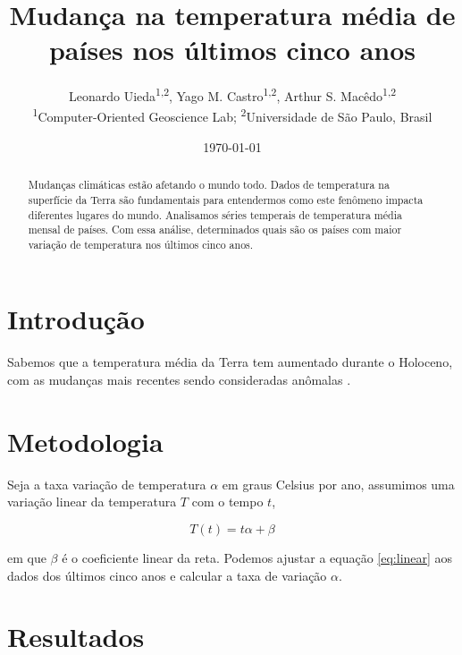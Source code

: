 \documentclass[twocolumn,A4]{article}
\begin{document}
\title{Mudança na temperatura média de países nos últimos cinco anos}
\author{
    Leonardo Uieda\textsuperscript{1,2},
    Yago M. Castro\textsuperscript{1,2},
    Arthur S. Macêdo\textsuperscript{1,2}
    \\[0.2cm]
    {\small
        \textsuperscript{1}Computer-Oriented Geoscience Lab;
        \textsuperscript{2}Universidade de São Paulo, Brasil
    }
}
\date{\today}

\maketitle

\begin{abstract}
Mudanças climáticas estão afetando o mundo todo.
Dados de temperatura na superfície da Terra são fundamentais para entendermos como este fenômeno impacta diferentes lugares do mundo.
Analisamos séries temperais de temperatura média mensal de \NPaises{} países.
Com essa análise, determinados quais são os países com maior variação de
temperatura nos últimos cinco anos.
\end{abstract}

\section{Introdução}

Sabemos que a temperatura média da Terra tem aumentado durante o Holoceno, com
as mudanças mais recentes sendo consideradas anômalas \citet{Osman2021}.

\section{Metodologia}

Seja a taxa variação de temperatura $\alpha$ em graus Celsius por ano,
assumimos uma variação linear da temperatura $T$ com o tempo $t$,

\begin{equation}
    T(t) = t \alpha + \beta
    \label{eq:linear}
\end{equation}

\noindent
em que $\beta$ é o coeficiente linear da reta.
Podemos ajustar a equação \ref{eq:linear} aos dados dos últimos cinco anos
e calcular a taxa de variação $\alpha$.

\section{Resultados}
\end{document}
